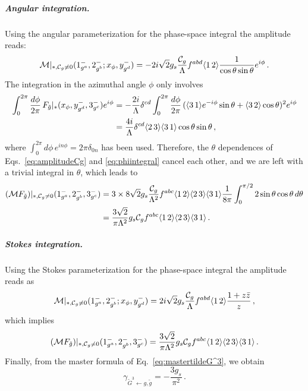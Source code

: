 \subparagraph{Angular integration.}
Using the angular parameterization for the phase-space integral the amplitude reads:
\begin{equation}\label{eq:amplitudeCg}
    \mathcal{M}|_{*,\mathcal C_g \neq  0}(1^-_{g^a},2^-_{g^b};x_\phi,y^-_{g^d}) = -2i\sqrt{2}g_s \frac{\mathcal C_g}{\Lambda}f^{abd}\langle1\, 2 \rangle\frac{1}{ \cos\theta\sin\theta}e^{i\phi}\,.
\end{equation}
The integration in the azimuthal angle $\phi$ only involves
\begin{align}
    \int_0^{2\pi}\frac{d\phi}{2\pi}\,F_{\tilde g}|_*(x_\phi,y^-_{g^d},3^-_{g^c}) e^{i\phi} &= 
    -\frac{2i}{\Lambda}\delta^{cd}\int_0^{2\pi}\frac{d\phi}{2\pi}\, (\langle3\, 1 \rangle e^{-i\phi}\sin\theta + \langle3\, 2 \rangle\cos\theta)^2e^{i\phi}
    \nonumber \\&=\frac{4i}{\Lambda}\delta^{cd}\langle2\, 3 \rangle\langle3\, 1 \rangle\cos\theta\sin\theta\,,\label{eq:phiintegral}
\end{align}
where $\int_0^{2\pi} d\phi\,e^{in\phi}=2\pi\delta_{0n}$ has been used.
Therefore, the $\theta$ dependences of Eqs.~\eqref{eq:amplitudeCg} and \eqref{eq:phiintegral} cancel each other, and we are left with a trivial integral in $\theta$, which leads to
\begin{align}
    (\mathcal M F_{\tilde g})|_{*,\mathcal C_g \neq  0}(1^-_{g^a},2^-_{g^b},3^-_{g^c}) &= 3\times 8\sqrt 2 g_s \frac{\mathcal C_g}{\Lambda^2}f^{abc}\langle1\, 2 \rangle\langle2\, 3 \rangle \langle3\, 1 \rangle \frac{1}{8\pi}\int_0^{\pi/2}2\sin\theta\cos\theta\,d\theta \nonumber \\
    &= \frac{3\sqrt{2}}{\pi\Lambda^2} g_s\mathcal  C_gf^{abc} \langle1\, 2 \rangle\langle2\, 3 \rangle \langle3\, 1 \rangle\,.
\end{align}

\subparagraph{Stokes integration.}
Using the Stokes parameterization for the phase-space integral the amplitude reads as
\begin{equation}
    \mathcal{M}|_{*,\mathcal C_g \neq  0}(1^-_{g^a},2^-_{g^b};x_\phi,y^-_{g^d}) = 2i\sqrt{2}g_s \frac{\mathcal C_g}{\Lambda}f^{abd}\langle1\, 2 \rangle\frac{1+z\bar{z}}{ z}\,,
\end{equation}
which implies
\begin{equation}
    (\mathcal M F_{\tilde g})|_{*,\mathcal C_g \neq  0}(1^-_{g^a},2^-_{g^b},3^-_{g^c}) =  \frac{3\sqrt{2}}{\pi\Lambda^2} g_s\mathcal  C_gf^{abc} \langle1\, 2 \rangle\langle2\, 3 \rangle \langle3\, 1 \rangle\,.
\end{equation}
Finally, from the master formula of Eq.~\eqref{eq:mastertildeG^3}, we obtain
\begin{equation}
\label{eq:gammatildeG3}
    \gamma_{\tilde G^3\leftarrow g,\tilde g} = -\frac{3g_s}{\pi^2}\,.
\end{equation}

